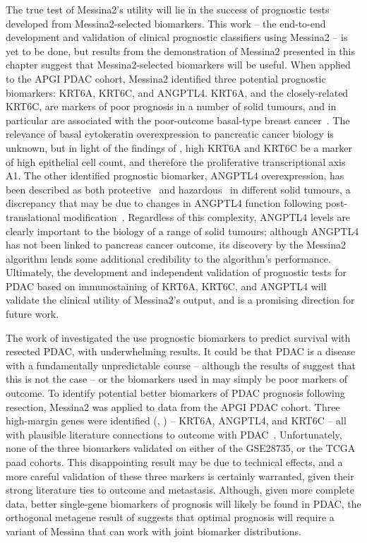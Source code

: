 \documentclass[dissertation.tex]{subfiles}
\begin{document}
The true test of Messina2's utility will lie in the success of prognostic tests developed from Messina2-selected biomarkers.  This work -- the end-to-end development and validation of clinical prognostic classifiers using Messina2 -- is yet to be done, but results from the demonstration of Messina2 presented in this chapter suggest that Messina2-selected biomarkers will be useful.  When applied to the \gls{APGI} \gls{PDAC} cohort, Messina2 identified three potential prognostic biomarkers: KRT6A, KRT6C, and ANGPTL4.  KRT6A, and the closely-related KRT6C, are markers of poor prognosis in a number of solid tumours, and in particular are associated with the poor-outcome basal-type breast cancer~\cite{Cheang2008,Pintens2009}.  The relevance of basal cytokeratin overexpression to pancreatic cancer biology is unknown, but in light of the findings of , high KRT6A and KRT6C be a marker of high epithelial cell count, and therefore the proliferative transcriptional axis A1.  The other identified prognostic biomarker, ANGPTL4 overexpression, has been described as both protective~\cite{Ng2014} and hazardous~\cite{Tanaka2015,Li2015} in different solid tumours, a discrepancy that may be due to changes in ANGPTL4 function following post-translational modification~\cite{Tan2012}.  Regardless of this complexity, ANGPTL4 levels are clearly important to the biology of a range of solid tumours; although ANGPTL4 has not been linked to pancreas cancer outcome, its discovery by the Messina2 algorithm lends some additional credibility to the algorithm's performance.  Ultimately, the development and independent validation of prognostic tests for \gls{PDAC} based on immunostaining of KRT6A, KRT6C, and ANGPTL4 will validate the clinical utility of Messina2's output, and is a promising direction for future work.

The work of  investigated the use prognostic biomarkers to predict survival with resected \gls{PDAC}, with underwhelming results.  It could be that \gls{PDAC} is a disease with a fundamentally unpredictable course -- although the results of  suggest that this is not the case -- or the biomarkers used in  may simply be poor markers of outcome.  To identify potential better biomarkers of \gls{PDAC} prognosis following resection, Messina2 was applied to data from the \gls{APGI} \gls{PDAC} cohort.  Three high-margin genes were identified (, ) -- KRT6A, ANGPTL4, and KRT6C -- all with plausible literature connections to outcome with \gls{PDAC}~\cite{Adhikary2013,Choi2014,Kim2011b,Livasy2006,Padua2008,VandenBroeck2012,Xiao2012}.  Unfortunately, none of the three biomarkers validated on either of the GSE28735, or the \gls{TCGA} paad cohorts.  This disappointing result may be due to technical effects, and a more careful validation of these three markers is certainly warranted, given their strong literature ties to outcome and metastasis.  Although, given more complete data, better single-gene biomarkers of prognosis will likely be found in \gls{PDAC}, the orthogonal metagene result of  suggests that optimal prognosis will require a variant of Messina that can work with joint biomarker distributions.
\end{document}

